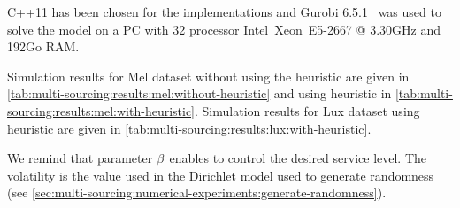 

C++11 has been chosen for the implementations and Gurobi 6.5.1~\citet{gurobi} was used to solve the model on a PC with 32 processor Intel\textregistered\ Xeon\texttrademark\ E5-2667 @ 3.30GHz and 192Go RAM.


Simulation results for Mel dataset without using the heuristic are given in \cref{tab:multi-sourcing:results:mel:without-heuristic} and using heuristic in \cref{tab:multi-sourcing:results:mel:with-heuristic}.
Simulation results for Lux dataset using heuristic are given in \cref{tab:multi-sourcing:results:lux:with-heuristic}.


We remind that parameter $\beta$ enables to control the desired service level.
The volatility is the value used in the Dirichlet model used to generate randomness (see \cref{sec:multi-sourcing:numerical-experiments:generate-randomness}).



